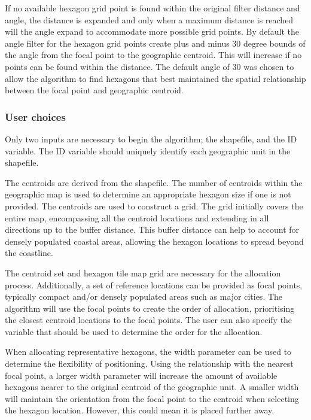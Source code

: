 If no available hexagon grid point is found within the original filter distance and angle, the distance is expanded and only when a maximum distance is reached will the angle expand to accommodate more possible grid points.
By default the angle filter for the hexagon grid points create plus and minus 30 degree bounds of the angle from the focal point to the geographic centroid. This will increase if no points can be found within the  distance. The default angle of 30 was chosen to allow the algorithm to find hexagons that best maintained the spatial relationship between the focal point and geographic centroid.

\hypertarget{user-choices}{%
\subsubsection{User choices}\label{user-choices}}

Only two inputs are necessary to begin the algorithm; the shapefile, and the ID variable. The ID variable should uniquely identify each geographic unit in the shapefile.

The centroids are derived from the shapefile. The number of centroids within the geographic map is used to determine an appropriate hexagon size if one is not provided. The centroids are used to construct a grid. The grid initially covers the entire map, encompassing all the centroid locations and extending in all directions up to the buffer distance. This buffer distance can help to account for densely populated coastal areas, allowing the hexagon locations to spread beyond the coastline.

The centroid set and hexagon tile map grid are necessary for the allocation process. Additionally, a set of reference locations can be provided as focal points, typically compact and/or densely populated areas such as major cities. The algorithm will use the focal points to create the order of allocation, prioritising the closest centroid locations to the focal points. The user can also specify the variable that should be used to determine the order for the allocation.

When allocating representative hexagons, the width parameter can be used to determine the flexibility of positioning. Using the relationship with the nearest focal point, a larger width parameter will increase the amount of available hexagons nearer to the original centroid of the geographic unit. A smaller width will maintain the orientation from the focal point to the centroid when selecting the hexagon location. However, this could mean it is placed further away.

